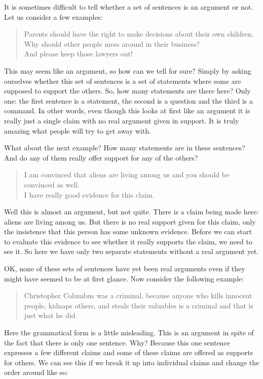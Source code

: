 \documentclass[justified]{tufte-book}
\newenvironment{argument}{\begin{quote}\normalsize}{\end{quote}}
\begin{document}
It is sometimes difficult to tell whether a set of sentences is an argument or not. Let us consider a few examples:

\begin{argument}
Parents should have the right to make decisions about their own
children.\\
Why should other people mess around in their business?\\
And please keep those lawyers out!
\end{argument}

This may seem like an argument, so how can we tell for sure? Simply by asking ourselves whether this set of sentences is a set of statements where some are supposed to support the others. So, how many statements are there here? Only one: the first sentence is a statement, the second is a question and the third is a command. In other words, even though this looks at first like an argument it is really just a single claim with no real argument given in support. It is truly amazing what people will try to get away with.

What about the next example? How many statements are in these sentences? And do any of them really offer support for any of the others?

\begin{argument}
I am convinced that aliens are living among us and you should be
convinced as well.\\
I have really good evidence for this claim.
\end{argument}

Well this is almost an argument, but not quite. There is a claim being made here: aliens are living among us. But there is no real support given for this claim, only the insistence that this person has some unknown evidence. Before we can start to evaluate this evidence to see whether it really supports the claim, we need to see it. So here we have only two separate statements without a real argument yet.

OK, none of these sets of sentences have yet been real arguments even if they might have seemed to be at first glance. Now consider the following example:

\begin{argument}
Christopher Columbus was a criminal, because anyone who kills innocent
people, kidnaps others, and steals their valuables is a criminal and
that is just what he did.
\end{argument}

Here the grammatical form is a little misleading. This is an argument in spite of the fact that there is only one sentence. Why? Because this one sentence expresses a few different claims and some of these claims are offered as supports for others. We can see this if we break it up into individual claims and change the order around like so:
\end{document}
